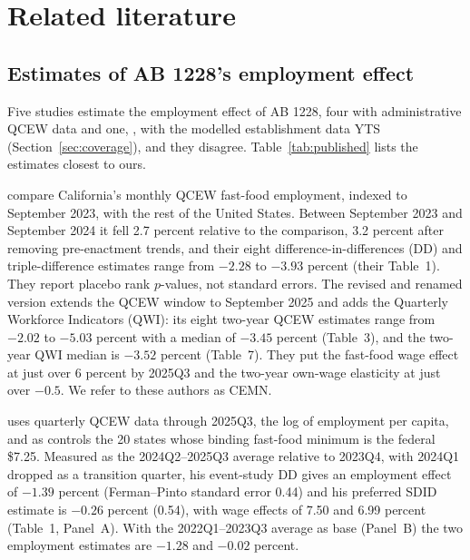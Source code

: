 \section{Related literature}
\label{sec:literature}

\subsection{Estimates of AB 1228's employment effect}
\label{sec:lit-estimates}

Five studies estimate the employment effect of AB 1228, four with administrative QCEW data and
one, \citet{melo2026covered}, with the modelled establishment data YTS
(Section~\ref{sec:coverage}), and they disagree. Table~\ref{tab:published} lists the estimates closest to ours.

\citet{clemens2025did} compare California's monthly QCEW fast-food employment, indexed to
September 2023, with the rest of the United States. Between September 2023 and September 2024
it fell 2.7 percent relative to the comparison, 3.2 percent after removing pre-enactment trends,
and their eight difference-in-differences (DD) and triple-difference estimates range from $-2.28$
to $-3.93$ percent (their Table~1). They report placebo rank $p$-values, not standard errors. The
revised and renamed version \citep{clemens2026employment} extends the QCEW window to September
2025 and adds the Quarterly Workforce Indicators (QWI): its eight two-year QCEW estimates range
from $-2.02$ to $-5.03$ percent with a median of $-3.45$ percent (Table~3), and the two-year QWI
median is $-3.52$ percent (Table~7). They put the fast-food wage effect at just over 6 percent by
2025Q3 and the two-year own-wage elasticity at just over $-0.5$. We refer to these authors as
CEMN.

\citet{dube2026labor} uses quarterly QCEW data through 2025Q3, the log of employment per capita,
and as controls the 20 states whose binding fast-food minimum is the federal \$7.25. Measured as
the 2024Q2--2025Q3 average relative to 2023Q4, with 2024Q1 dropped as a transition quarter, his
event-study DD gives an employment effect of $-1.39$ percent (Ferman--Pinto standard error 0.44)
and his preferred SDID estimate is $-0.26$ percent (0.54), with wage effects of 7.50 and 6.99
percent (Table~1, Panel~A). With the 2022Q1--2023Q3 average as base (Panel~B) the two employment
estimates are $-1.28$ and $-0.02$ percent.

